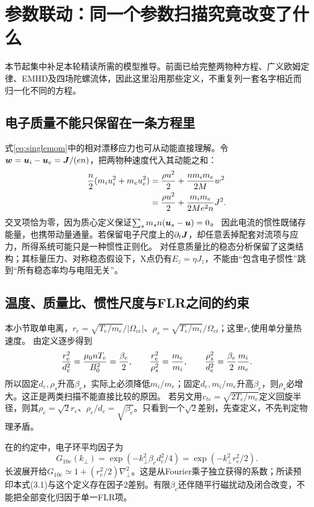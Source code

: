 \section{参数联动：同一个参数扫描究竟改变了什么}
本节起集中补足本轮精读所需的模型推导。前面已给完整两物种方程、广义欧姆定律、EMHD及四场陀螺流体，因此这里沿用那些定义，不重复列一套名字相近而归一化不同的方程。

\subsection{电子质量不能只保留在一条方程里}
式\eqref{eq:singlemom}中的相对漂移应力也可从动能直接理解。令$\bm{w}=\bm{u}_i-\bm{u}_e=\bm{J}/(en)$，把两物种速度代入其动能之和：
\begin{align}
 {n\over2}(m_iu_i^2+m_eu_e^2)
 &= {\rho u^2\over2}+{nm_im_e\over2M}w^2\\
 &= {\rho u^2\over2}+{m_im_e\over2Me^2n}J^2.
 \label{eq:selected-driftenergy}
\end{align}
交叉项恰为零，因为质心定义保证$\sum_s m_sn(\bm{u}_s-\bm{u})=0$。
因此电流的惯性既储存能量，也携带动量通量。若保留电子尺度上的$\partial_t\bm{J}$，却任意丢掉配套对流项与应力，所得系统可能只是一种惯性正则化。
\citet{L160}对任意质量比的稳态分析保留了这类结构；其标量压力、对称稳态假设下，X点仍有$E_z=\eta J_z$，不能由“包含电子惯性”跳到“所有稳态率均与电阻无关”。

\subsection{温度、质量比、惯性尺度与FLR之间的约束}
本小节取单电离，$r_e=\sqrt{T_e/m_e}/|\Omega_{ce}|$、$\rho_s=\sqrt{T_e/m_i}/\Omega_{ci}$；这里$r_e$使用单分量热速度。
由定义逐步得到
\begin{equation}
 {r_e^2\over d_e^2}={\mu_0nT_e\over B_0^2}={\beta_e\over2},\qquad
 {r_e^2\over\rho_s^2}={m_e\over m_i},\qquad
 {\rho_s^2\over d_e^2}={\beta_e\over2}{m_i\over m_e}.
 \label{eq:selected-beta}
\end{equation}
所以固定$d_e,\rho_s$升高$\beta_e$，实际上必须降低$m_i/m_e$；固定$d_e,m_i/m_e$升高$\beta_e$，则$\rho_s$必增大。这正是\citet{E474}两类扫描不能直接比较的原因。
若另文用$v_{te}=\sqrt{2T_e/m_e}$定义回旋半径，则其$\rho_e=\sqrt2r_e$、$\rho_e/d_e=\sqrt{\beta_e}$。只看到一个$\sqrt2$差别，先查定义，不先判定物理矛盾。

在\citet{E474}的约定中，电子环平均因子为
\begin{equation}
 G_{10e}(k_\perp)=\exp(-k_\perp^2\beta_ed_e^2/4)
 =\exp(-k_\perp^2r_e^2/2).
\end{equation}
长波展开给$G_{10e}\simeq1+(r_e^2/2)\nabla_\perp^2$。这是从Fourier乘子独立获得的系数；所读预印本式(3.1)与这个定义存在因子2差别。有限$\beta_e$还伴随平行磁扰动及闭合改变，不能把全部变化归因于单一FLR项。

